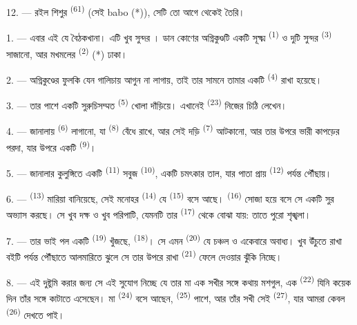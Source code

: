 12. --- রইল শিশুর  \textsuperscript{(61)} (সেই babo (*)), সেটি তো
আগে থেকেই তৈরি।

\VUsaut{5.0mm}
\VUsaut{3.0mm}

1. --- এবার এই যে বৈঠকখানা। এটি খুব সুন্দর । ডান কোণের
অগ্নিকুণ্ডটি একটি সূক্ষ্ম  \textsuperscript{(1)} ও দুটি সুন্দর
 \textsuperscript{(3)} সাজানো, আর মখমলের 
\textsuperscript{(2)} (*) ঢাকা।

2. --- অগ্নিকুণ্ডের ফুলকি যেন গালিচায় আগুন না লাগায়, তাই তার সামনে তামার
একটি  \textsuperscript{(4)} রাখা হয়েছে।

3. --- তার পাশে একটি সুরুচিসম্মত  \textsuperscript{(5)} খোলা
দাঁড়িয়ে। এখানেই  \textsuperscript{(23)} নিজের চিঠি লেখেন।

4. --- জানালায়  \textsuperscript{(6)} লাগানো, যা
 \textsuperscript{(8)} বেঁধে রাখে, আর সেই দড়ি 
\textsuperscript{(7)} আটকানো, আর তার উপরে ভারী কাপড়ের পরদা, যার উপরে একটি
 \textsuperscript{(9)}।

5. --- জানালার কুলুঙ্গিতে একটি  \textsuperscript{(11)} সবুজ
 \textsuperscript{(10)}, একটি চমৎকার তাল, যার পাতা প্রায়
 \textsuperscript{(12)} পর্যন্ত পৌঁছায়।

6. ---  \textsuperscript{(13)} মারিয়া বানিয়েছে, সেই মনোহর
 \textsuperscript{(14)} যে  \textsuperscript{(15)}
বসে আছে।  \textsuperscript{(16)} সোজা হয়ে বসে সে একটি সুর অভ্যাস
করছে। সে খুব দক্ষ ও খুব পরিপাটি, যেমনটি তার 
\textsuperscript{(17)} থেকে বোঝা যায়: তাতে পুরো শৃঙ্খলা।

\VUsaut{5.0mm}
\VUsaut{3.0mm}

7. --- তার ভাই পল একটি  \textsuperscript{(19)} খুঁজছে,
 \textsuperscript{(18)}। সে এমন 
\textsuperscript{(20)} যে চঞ্চল ও একেবারে অবাধ্য। খুব উঁচুতে রাখা বইটি পর্যন্ত
পৌঁছাতে আলমারিতে ঝুলে সে তার উপরে রাখা 
\textsuperscript{(21)} ফেলে দেওয়ার ঝুঁকি নিচ্ছে।

8. --- এই দুষ্টুমি করার জন্য সে এই সুযোগ নিচ্ছে যে তার মা এক সখীর সঙ্গে কথায়
মশগুল, এক  \textsuperscript{(22)} যিনি কয়েক দিন তাঁর সঙ্গে
কাটাতে এসেছেন। মা  \textsuperscript{(24)} বসে আছেন,
 \textsuperscript{(25)} পাশে, আর তাঁর সখী সেই
 \textsuperscript{(27)}, যার আমরা কেবল 
\textsuperscript{(26)} দেখতে পাই।

